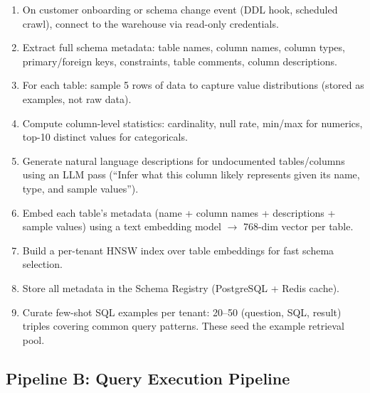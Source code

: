 \begin{enumerate}
  \item On customer onboarding or schema change event (DDL hook, scheduled crawl), connect to the warehouse via read-only credentials.
  \item Extract full schema metadata: table names, column names, column types, primary/foreign keys, constraints, table comments, column descriptions.
  \item For each table: sample 5 rows of data to capture value distributions (stored as examples, not raw data).
  \item Compute column-level statistics: cardinality, null rate, min/max for numerics, top-10 distinct values for categoricals.
  \item Generate natural language descriptions for undocumented tables/columns using an LLM pass (``Infer what this column likely represents given its name, type, and sample values'').
  \item Embed each table's metadata (name + column names + descriptions + sample values) using a text embedding model $\rightarrow$ 768-dim vector per table.
  \item Build a per-tenant HNSW index over table embeddings for fast schema selection.
  \item Store all metadata in the Schema Registry (PostgreSQL + Redis cache).
  \item Curate few-shot SQL examples per tenant: 20--50 (question, SQL, result) triples covering common query patterns. These seed the example retrieval pool.
\end{enumerate}

\subsection*{Pipeline B: Query Execution Pipeline}

